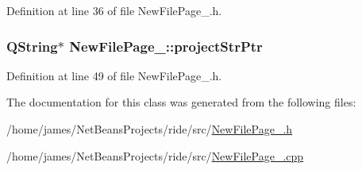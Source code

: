 Definition at line 36 of file New\-File\-Page\-\_.\-h.

\hypertarget{class_new_file_page__4_ab1f30508de73c5748ed96c7acd2c0821}{
\subsubsection[{project\-Str\-Ptr}]{\setlength{\rightskip}{0pt plus 5cm}Q\-String$\ast$ New\-File\-Page\-\_\-::project\-Str\-Ptr\hspace{0.3cm}{\ttfamily [private]}}}\label{class_new_file_page__4_ab1f30508de73c5748ed96c7acd2c0821}


Definition at line 49 of file New\-File\-Page\-\_.\-h.



The documentation for this class was generated from the following files\-:\begin{DoxyCompactItemize}
\item 
/home/james/\-Net\-Beans\-Projects/ride/src/\hyperlink{_new_file_page__4_8h}{New\-File\-Page\-\_.\-h}\item 
/home/james/\-Net\-Beans\-Projects/ride/src/\hyperlink{_new_file_page__4_8cpp}{New\-File\-Page\-\_.\-cpp}\end{DoxyCompactItemize}
